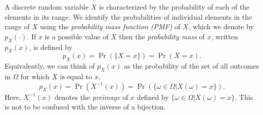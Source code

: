 A discrete random variable $X$ is characterized by the probability of each of the elements in its range.
We identify the probabilities of individual elements in the range of $X$ using the \emph{probability mass function (PMF)} of $X$, which we denote by $p_X (\cdot)$. 
If $x$ is a possible value of $X$ then the \emph{probability mass} of $x$, written $p_X (x)$, is defined by
\begin{equation} \label{equation:PMF}
p_X (x) = \Pr ( \{ X = x \} ) = \Pr ( X = x ) .
\end{equation}
Equivalently, we can think of $p_X (x)$ as the probability of the set of all outcomes in $\Omega$ for which $X$ is equal to $x$,
\begin{equation*}
p_X (x)
= \Pr (  X^{-1} (x)  )
= \Pr ( \{ \omega \in \Omega | X(\omega) = x \} ) .
\end{equation*}
Here, $X^{-1} (x)$ denotes the \emph{preimage} of $x$ defined by $\{ \omega \in \Omega | X(\omega) = x \}$. 
This is not to be confused with the inverse of a bijection.

